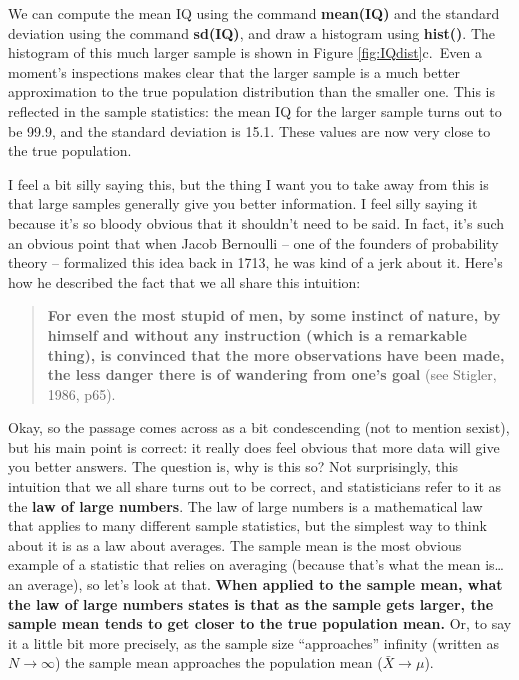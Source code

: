 \documentclass[
]{book}
\begin{document}
We can compute the mean IQ using the command \textbf{mean(IQ)} and the standard deviation using the command \textbf{sd(IQ)}, and draw a histogram using \textbf{hist()}. The histogram of this much larger sample is shown in Figure \ref{fig:IQdist}c.~Even a moment's inspections makes clear that the larger sample is a much better approximation to the true population distribution than the smaller one. This is reflected in the sample statistics: the mean IQ for the larger sample turns out to be 99.9, and the standard deviation is 15.1. These values are now very close to the true population.

I feel a bit silly saying this, but the thing I want you to take away from this is that large samples generally give you better information. I feel silly saying it because it's so bloody obvious that it shouldn't need to be said. In fact, it's such an obvious point that when Jacob Bernoulli -- one of the founders of probability theory -- formalized this idea back in 1713, he was kind of a jerk about it. Here's how he described the fact that we all share this intuition:

\begin{quote}
\textbf{For even the most stupid of men, by some instinct of nature, by himself and without any instruction (which is a remarkable thing), is convinced that the more observations have been made, the less danger there is of wandering from one's goal} (see Stigler, 1986, p65).
\end{quote}

Okay, so the passage comes across as a bit condescending (not to mention sexist), but his main point is correct: it really does feel obvious that more data will give you better answers. The question is, why is this so? Not surprisingly, this intuition that we all share turns out to be correct, and statisticians refer to it as the \textbf{law of large numbers}. The law of large numbers is a mathematical law that applies to many different sample statistics, but the simplest way to think about it is as a law about averages. The sample mean is the most obvious example of a statistic that relies on averaging (because that's what the mean is\ldots{} an average), so let's look at that. \textbf{When applied to the sample mean, what the law of large numbers states is that as the sample gets larger, the sample mean tends to get closer to the true population mean.} Or, to say it a little bit more precisely, as the sample size ``approaches'' infinity (written as \(N \rightarrow \infty\)) the sample mean approaches the population mean (\(\bar{X} \rightarrow \mu\)).
\end{document}
